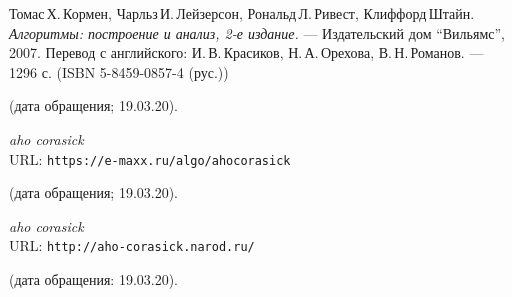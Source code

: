 \begin{thebibliography}{99}

Томас\,Х.\,Кормен, Чарльз\,И.\,Лейзерсон, Рональд\,Л.\,Ривест, Клиффорд\,Штайн.
{\itshape Алгоритмы: построение и анализ, 2-е издание.} --- Издательский дом \enquote{Вильямс}, 2007. Перевод с английского: И.\,В.\,Красиков, Н.\,А.\,Орехова, В.\,Н.\,Романов. --- 1296 с. (ISBN 5-8459-0857-4 (рус.))

(дата обращения; 19.03.20).

{\itshape aho corasick} \\URL: \texttt{https://e-maxx.ru/algo/ahocorasick}

(дата обращения; 19.03.20).

{\itshape aho corasick} \\URL: \texttt{http://aho-corasick.narod.ru/}

(дата обращения: 19.03.20).

\end{thebibliography}
\pagebreak